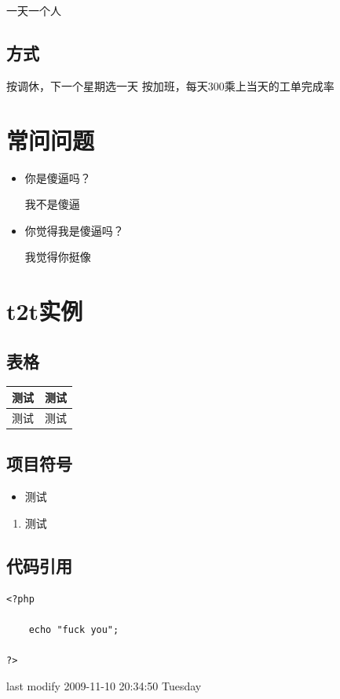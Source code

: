 \documentclass{article}
\begin{document}
一天一个人

\hypertarget{toc25}{}
\subsection{方式}
按调休，下一个星期选一天
按加班，每天300乘上当天的工单完成率

\clearpage

\hypertarget{toc26}{}
\section{常问问题}
\begin{itemize}
\item 你是傻逼吗？

我不是傻逼

\item 你觉得我是傻逼吗？

我觉得你挺像
\end{itemize}


\hrulefill{}



\hypertarget{toc27}{}
\section{t2t实例}
\hypertarget{toc28}{}
\subsection{表格}
\begin{center}\begin{tabular}{|l|l|}
\hline \textbf{测试} & \textbf{测试} \\
\hline 测试 & 测试 \\
\hline \end{tabular}\end{center}

\hypertarget{toc29}{}
\subsection{项目符号}
\begin{itemize}
\item 测试
\end{itemize}

\begin{enumerate}
\item 测试
\end{enumerate}

\hypertarget{toc30}{}
\subsection{代码引用}
\begin{verbatim}
<?php

    echo "fuck you";

?>
\end{verbatim}


\hrulefill{}


last modify 2009-11-10 20:34:50 Tuesday


\end{document}
